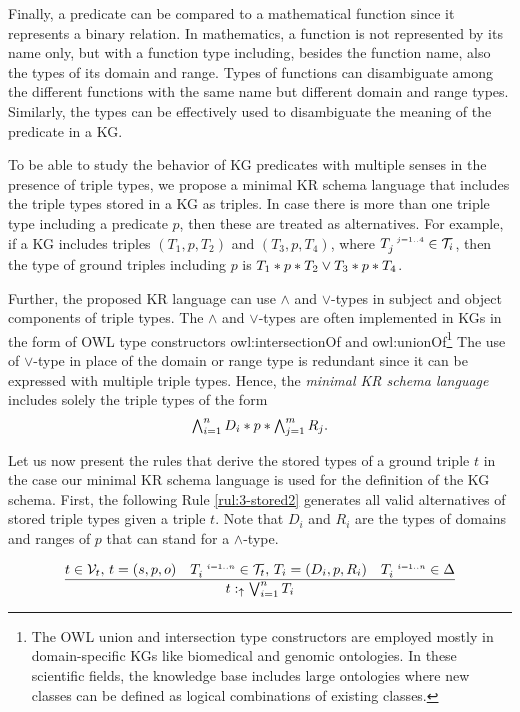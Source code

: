 \documentclass[runningheads]{llncs}
\newcommand{\s}{\scriptscriptstyle\ \,}
\newcommand{\uarr}{\uparrow}
\newcommand{\V}{{\cal V}}
\newcommand{\T}{{\cal T}}
\begin{document}
Finally, a predicate can be compared to a mathematical function since
it represents a binary relation. In mathematics, a function is not
represented by its name only, but with a function type including,
besides the function name, also the types of its domain and
range. Types of functions can disambiguate among the different
functions with the same name but different domain and range
types. Similarly, the types can be effectively used to disambiguate
the meaning of the predicate in a KG.

To be able to study the behavior of KG predicates with multiple senses
in the presence of triple types, we propose a minimal KR schema
language that includes the triple types stored in a KG as triples. In
case there is more than one triple type including a predicate $p$,
then these are treated as alternatives. For example, if a KG includes
triples $(T_1,p,T_2)$ and $(T_3,p,T_4)$, where
$T_j^{\s\/j=1..4}\in\T_i$, then the type of ground triples including
$p$ is $T_1*p*T_2\lor\/T_3*p*T_4$.

Further, the proposed KR language can use $\land$ and $\lor$-types in
subject and object components of triple types. The $\land$ and
$\lor$-types are often implemented in KGs in the form of OWL type
constructors owl:intersectionOf and owl:unionOf\footnote{The OWL union
  and intersection type constructors are employed mostly in domain-specific KGs like biomedical and genomic ontologies. In these
  scientific fields, the knowledge base includes large ontologies where
  new classes can be defined as logical combinations of existing
  classes.} The use of $\lor$-type in place of the domain or range
type is redundant since it can be expressed with multiple triple
types. Hence, the \emph{minimal KR schema language} includes solely
the triple types of the form
$$\textstyle\bigwedge_{i=1}^n\/D_i*p*\bigwedge_{j=1}^m\/R_j.$$

Let us now present the rules that derive the stored types of a ground
triple $t$ in the case our minimal KR schema language is used for the
definition of the KG schema. First, the following Rule
\ref{rul:3-stored2} generates all valid alternatives of stored triple
types given a triple $t$. Note that $D_i$ and $R_i$ are the types of
domains and ranges of $p$ that can stand for a $\land$-type.

\begin{equation}
\label{rul:3-stored2}
\dfrac{t\in\V_t,\, t=(s,p,o)\quad T_i^{\s\/i=1..n}\in\T_t,\, T_i=(D_i,p,R_i)\quad\/T_i^{\s\/i=1..n}\in\Delta}
      {t:_\uarr\/\bigvee_{i=1}^n\/T_i}
\end{equation}
\end{document}
